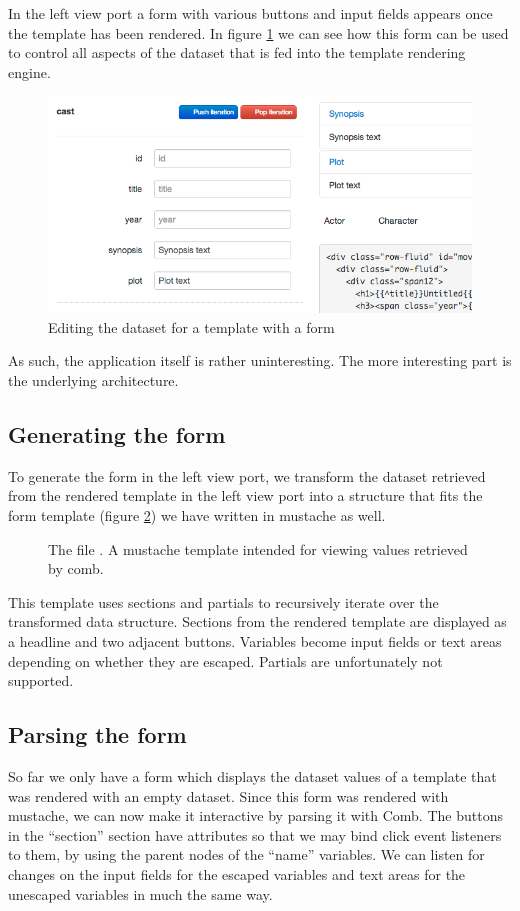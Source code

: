 \documentclass[thesis.tex]{subfiles}
\begin{document}
In the left view port a form with various buttons and input fields appears once
the template has been rendered. In figure \ref{fig:editor-form} we can see how
this form can be used to control all aspects of the dataset that is fed into
the template rendering engine.
\begin{figure}
	\centering
	\includegraphics[max width=\linewidth]{graphics/editor-form}
	\caption{Editing the dataset for a template with a form}
	\label{fig:editor-form}
\end{figure}

As such, the application itself is rather uninteresting. The more interesting
part is the underlying architecture.

\subsection{Generating the form}
To generate the form in the left view port, we transform the dataset retrieved
from the rendered template in the left view port into a structure that fits the
form template (figure \ref{fig:mustache.mustache}) we have written in mustache
as well.
\begin{figure}
	\centering
	
	\caption{The file . A mustache template intended for viewing values retrieved by comb.}
	\label{fig:mustache.mustache}
\end{figure}

This template uses sections and partials to recursively iterate over the
transformed data structure.
Sections from the rendered template are displayed as a headline and two adjacent
buttons.
Variables become input fields or text areas depending on whether they are
escaped.
Partials are unfortunately not supported.

\subsection{Parsing the form}
So far we only have a form which displays the dataset values of a template that
was rendered with an empty dataset.
Since this form was rendered with mustache, we can now make it interactive by
parsing it with Comb. The buttons in the ``section'' section have
 attributes so that we may bind click event listeners to
them, by using the parent nodes of the ``name'' variables. We can listen
for changes on the input fields for the escaped variables and text areas for the
unescaped variables in much the same way.
\end{document}
